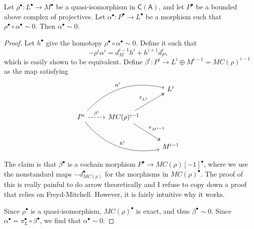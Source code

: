 \begin{lemma}\label{lma:5.9.5}
	Let $\rho ^{\bullet} : L^{\bullet}  \to M^{\bullet} $ be a quasi-isomorphism in $\mathsf{C} (\mathsf{A} )$, and let $P^{\bullet} $ be a bounded above complex of projectives. Let $\alpha ^{\bullet} : P^{\bullet}  \to L^{\bullet} $ be a morphism such that $\rho ^{\bullet} \circ \alpha ^{\bullet} \sim 0$. Then $\alpha ^{\bullet} \sim  0$.
\end{lemma}
\begin{proof}
	Let $h^{\bullet} $ give the homotopy $\rho ^{\bullet} \circ \alpha ^{\bullet} \sim 0$. Define it such that
	\[
		-\rho ^i\alpha ^i=d_M^{i-1} h^i+h^{i+1} d_P^{i} ,
	\]
	which is easily shown to be equivalent. Define $\beta ^i : P^i \to L^i\oplus M^{i-1} =MC(\rho )^{i-1} $ as the map satisfying
	\[\begin{tikzcd}[row sep = 2.5em, column sep = 2.5em]
		&&L^i\\
		P^i\ar[r, dashed, "\beta ^i"]\ar[urr, bend left, "\alpha ^i"]\ar[drr, bend right, "h^i"]&MC(\rho )^{i-1} \ar[ur, "\pi_{L^i} ", two heads]\ar[dr, "\pi_{M^{i-1} } ", two heads]\\
													&&M^{i-1} 
	\end{tikzcd}\]
	The claim is that $\beta ^{\bullet} $ is a cochain morphism $P^{\bullet} \to MC(\rho )[-1]^{\bullet} $, where we use the nonstandard maps $-d_{MC(\rho )}^{\bullet} $ for the morphisms in $MC(\rho )^{\bullet} $. The proof of this is really painful to do arrow theoretically and I refuse to copy down a proof that relies on Freyd-Mitchell. However, it is fairly intuitive why it works.

	Since $\rho ^{\bullet} $ is a quasi-isomorphism, $MC(\rho )^{\bullet} $ is exact, and thus $\beta ^{\bullet} \sim 0$. Since $\alpha ^{\bullet} =\pi_{L}^{\bullet} \circ \beta ^{\bullet} $, we find that $\alpha ^{\bullet} \sim 0$. 
\end{proof}

